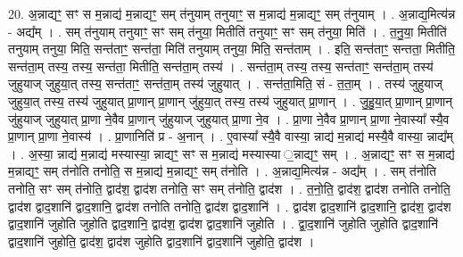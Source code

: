 \documentclass[17pt]{extarticle}
\begin{document}
20. अ॒न्नाद्यꣳ॒॒ सꣳ स म॒न्नाद्य॑ म॒न्नाद्यꣳ॒॒ सम् त॑नुयाम् तनुयाꣳ॒॒ स म॒न्नाद्य॑ म॒न्नाद्यꣳ॒॒ सम् त॑नुयाम् । . अ॒न्नाद्य॒मित्य॑न्न - अद्य᳚म् । . सम् त॑नुयाम् तनुयाꣳ॒॒ सꣳ सम् त॑नुया॒ मितीति॑ तनुयाꣳ॒॒ सꣳ सम् त॑नुया॒ मिति॑ । . त॒नु॒या॒ मितीति॑ तनुयाम् तनुया॒ मिति॒ सन्त॑ताꣳ॒॒ सन्त॑ता॒ मिति॑ तनुयाम् तनुया॒ मिति॒ सन्त॑ताम् । . इति॒ सन्त॑ताꣳ॒॒ सन्तता॒ मितीति॒ सन्त॑ता॒म् तस्य॒ तस्य॒ सन्त॑ता॒ मितीति॒ सन्त॑ता॒म् तस्य॑ । . सन्त॑ता॒म् तस्य॒ तस्य॒ सन्त॑ताꣳ॒॒ सन्त॑ता॒म् तस्य॑ जुहुयाज् जुहुया॒त् तस्य॒ सन्त॑ताꣳ॒॒ सन्त॑ता॒म् तस्य॑ जुहुयात् । . सन्त॑ता॒मिति॒ सं - त॒ता॒म् । . तस्य॑ जुहुयाज् जुहुया॒त् तस्य॒ तस्य॑ जुहुयात् प्रा॒णान् प्रा॒णान् जु॑हुया॒त् तस्य॒ तस्य॑ जुहुयात् प्रा॒णान् । . जु॒हु॒या॒त् प्रा॒णान् प्रा॒णान् जु॑हुयाज् जुहुयात् प्रा॒णा ने॒वैव प्रा॒णान् जु॑हुयाज् जुहुयात् प्रा॒णा ने॒व । . प्रा॒णा ने॒वैव प्रा॒णान् प्रा॒णा ने॒वास्या᳚ स्यै॒व प्रा॒णान् प्रा॒णा ने॒वास्य॑ । . प्रा॒णानिति॑ प्र - अ॒नान् । . ए॒वास्या᳚ स्यै॒वै वास्या॒ न्नाद्य॑ म॒न्नाद्य॑ मस्यै॒वै वास्या॒ न्नाद्य᳚म् । . अ॒स्या॒ न्नाद्य॑ म॒न्नाद्य॑ मस्यास्या॒ न्नाद्यꣳ॒॒ सꣳ स म॒न्नाद्य॑ मस्यास्या ॒न्नाद्यꣳ॒॒ सम् । . अ॒न्नाद्यꣳ॒॒ सꣳ स म॒न्नाद्य॑ म॒न्नाद्यꣳ॒॒ सम् त॑नोति तनोति॒ स म॒न्नाद्य॑ म॒न्नाद्यꣳ॒॒ सम् त॑नोति । . अ॒न्नाद्य॒मित्य॑न्न - अद्य᳚म् । . सम् त॑नोति तनोति॒ सꣳ सम् त॑नोति॒ द्वाद॑श॒ द्वाद॑श तनोति॒ सꣳ सम् त॑नोति॒ द्वाद॑श । . त॒नो॒ति॒ द्वाद॑श॒ द्वाद॑श तनोति तनोति॒ द्वाद॑श द्वाद॒शानि॑ द्वाद॒शानि॒ द्वाद॑श तनोति तनोति॒ द्वाद॑श द्वाद॒शानि॑ । . द्वाद॑श द्वाद॒शानि॑ द्वाद॒शानि॒ द्वाद॑श॒ द्वाद॑श द्वाद॒शानि॑ जुहोति जुहोति द्वाद॒शानि॒ द्वाद॑श॒ द्वाद॑श द्वाद॒शानि॑ जुहोति । . द्वा॒द॒शानि॑ जुहोति जुहोति द्वाद॒शानि॑ द्वाद॒शानि॑ जुहोति॒ द्वाद॑श॒ द्वाद॑श जुहोति द्वाद॒शानि॑ द्वाद॒शानि॑ जुहोति॒ द्वाद॑श । \newline
\end{document}
